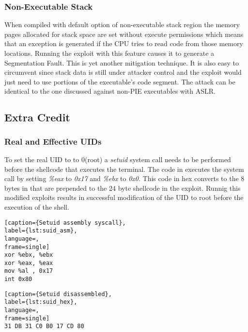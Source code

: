 \subsubsection { Non-Executable Stack }
When compiled with default option of non-executable stack region the memory pages allocated for stack space are set without execute permissions which means that an exception is generated if the CPU tries to read code from those memory locations. Running the exploit with this feature causes it to generate a Segmentation Fault. This is yet another mitigation technique. It is also easy to circumvent since stack data is still under attacker control and the exploit would just need to use portions of the executable's code segment. The attack can be identical to the one discussed against non-PIE executables with ASLR. \\
\subsection {Extra Credit}
\subsubsection{ Real and Effective UIDs }
To set the real UID to to 0(root) a \emph{setuid} system call needs to be performed before the shellcode that executes the terminal. The code in  executes the system call by setting \emph{\%eax} to \emph{0x17} and \emph{\%ebx} to \emph{0x0}. This code in hex converts to the 8 bytes in  that are prepended to the 24 byte shellcode in the exploit. Runnig this modified exploits results in successful modification of the UID to root before the execution of the shell.
\begin{lstlisting}[caption={Setuid assembly syscall},
label={lst:suid_asm},
language=,
frame=single]
xor %ebx, %ebx
xor %eax, %eax
mov %al , 0x17
int 0x80
\end{lstlisting}
\begin{lstlisting}[caption={Setuid disassembled},
label={lst:suid_hex},
language=,
frame=single]
31 DB 31 C0 B0 17 CD 80
\end{lstlisting}
